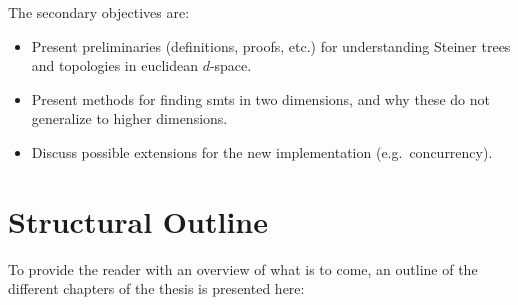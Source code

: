 The secondary objectives are:
%
\begin{itemize}
\item Present preliminaries (definitions, proofs, etc.) for understanding
  Steiner trees and topologies in euclidean $d$-space.
\item Present methods for finding \aclp{smt} in two dimensions, and why these do not
  generalize to higher dimensions.
\item Discuss possible extensions for the new implementation (e.g.\
  concurrency).
\end{itemize}

\section{Structural Outline}
\label{sec:structural-outline}

To provide the reader with an overview of what is to come, an outline of the
different chapters of the thesis is presented here:

